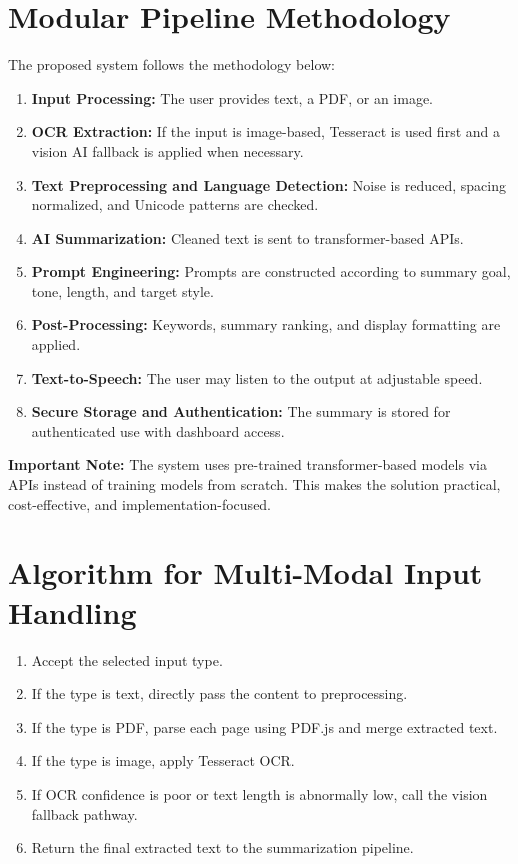 \documentclass[12pt, a4paper]{report}
\begin{document}
\section{Modular Pipeline Methodology}
The proposed system follows the methodology below:
\begin{enumerate}
  \item \textbf{Input Processing:} The user provides text, a PDF, or an image.
  \item \textbf{OCR Extraction:} If the input is image-based, Tesseract is used first and a vision AI fallback is applied when necessary.
  \item \textbf{Text Preprocessing and Language Detection:} Noise is reduced, spacing normalized, and Unicode patterns are checked.
  \item \textbf{AI Summarization:} Cleaned text is sent to transformer-based APIs.
  \item \textbf{Prompt Engineering:} Prompts are constructed according to summary goal, tone, length, and target style.
  \item \textbf{Post-Processing:} Keywords, summary ranking, and display formatting are applied.
  \item \textbf{Text-to-Speech:} The user may listen to the output at adjustable speed.
  \item \textbf{Secure Storage and Authentication:} The summary is stored for authenticated use with dashboard access.
\end{enumerate}

\textbf{Important Note:} The system uses pre-trained transformer-based models via APIs instead of training models from scratch. This makes the solution practical, cost-effective, and implementation-focused.

\section{Algorithm for Multi-Modal Input Handling}
\begin{enumerate}
  \item Accept the selected input type.
  \item If the type is text, directly pass the content to preprocessing.
  \item If the type is PDF, parse each page using PDF.js and merge extracted text.
  \item If the type is image, apply Tesseract OCR.
  \item If OCR confidence is poor or text length is abnormally low, call the vision fallback pathway.
  \item Return the final extracted text to the summarization pipeline.
\end{enumerate}
\end{document}
